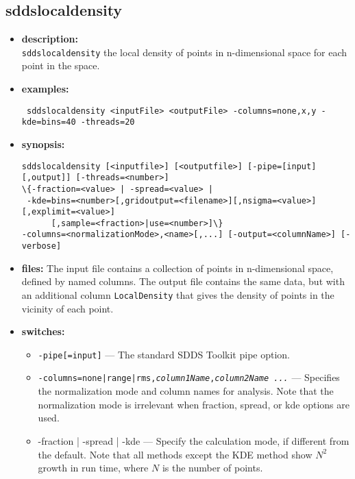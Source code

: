 \newpage 
\subsection{sddslocaldensity} 
\label{sddslocaldensity} 
 
\begin{itemize} 
\item {\bf description:} \hspace*{1mm}\\ 
{\tt sddslocaldensity} the local density of points in n-dimensional space for each point in the space.
\item {\bf examples:} 
\begin{flushleft}{\tt
   sddslocaldensity <inputFile> <outputFile> -columns=none,x,y -kde=bins=40 -threads=20
}\end{flushleft} 
\item {\bf synopsis:}  
\begin{flushleft}
\begin{verbatim}
sddslocaldensity [<inputfile>] [<outputfile>] [-pipe=[input][,output]] [-threads=<number>]
\{-fraction=<value> | -spread=<value> | 
 -kde=bins=<number>[,gridoutput=<filename>][,nsigma=<value>][,explimit=<value>]
      [,sample=<fraction>|use=<number>]\}
-columns=<normalizationMode>,<name>[,...] [-output=<columnName>] [-verbose]
\end{verbatim}
\end{flushleft} 
\item {\bf files:} 
The input file contains a collection of points in n-dimensional space, defined by named columns.
The output file contains the same data, but with an additional column {\tt LocalDensity} that gives 
the density of points in the vicinity of each point.
\item {\bf switches:} 
  \begin{itemize} 
  \item {\tt -pipe[=input]} --- The standard SDDS Toolkit pipe option. 
  \item {\tt -columns={none|range|rms},{\em column1Name},{\em column2Name ...}} --- 
    Specifies the normalization mode and column names for analysis.
    Note that the normalization mode is irrelevant when fraction, spread, or kde options are used.
  \item {-fraction | -spread | -kde} --- Specify the calculation mode, if different from the default.
    Note that all methods except the KDE method show $N^2$ growth in run time, where $N$ is the number of points.

\end{itemize}
\end{itemize}
